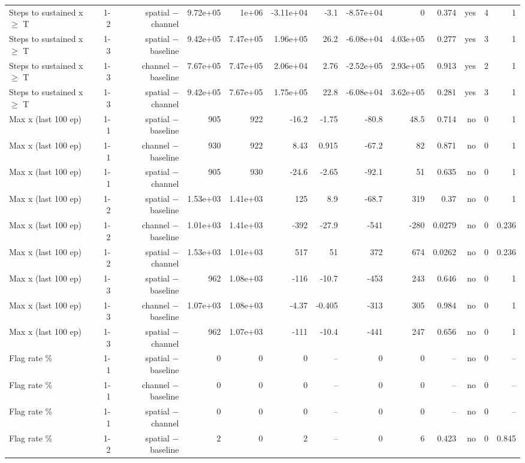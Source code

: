 \begin{table}[t]
\begin{tabular}{lrrrrrrrrrrrr}
Steps to sustained x $\geq$ T & 1-2 & spatial $-$ channel & 9.72e+05 & 1e+06 & -3.11e+04 & -3.1 & -8.57e+04 & 0 & 0.374 & yes & 4 & 1 \\
Steps to sustained x $\geq$ T & 1-3 & spatial $-$ baseline & 9.42e+05 & 7.47e+05 & 1.96e+05 & 26.2 & -6.08e+04 & 4.03e+05 & 0.277 & yes & 3 & 1 \\
Steps to sustained x $\geq$ T & 1-3 & channel $-$ baseline & 7.67e+05 & 7.47e+05 & 2.06e+04 & 2.76 & -2.52e+05 & 2.93e+05 & 0.913 & yes & 2 & 1 \\
Steps to sustained x $\geq$ T & 1-3 & spatial $-$ channel & 9.42e+05 & 7.67e+05 & 1.75e+05 & 22.8 & -6.08e+04 & 3.62e+05 & 0.281 & yes & 3 & 1 \\
Max x (last 100 ep) & 1-1 & spatial $-$ baseline & 905 & 922 & -16.2 & -1.75 & -80.8 & 48.5 & 0.714 & no & 0 & 1 \\
Max x (last 100 ep) & 1-1 & channel $-$ baseline & 930 & 922 & 8.43 & 0.915 & -67.2 & 82 & 0.871 & no & 0 & 1 \\
Max x (last 100 ep) & 1-1 & spatial $-$ channel & 905 & 930 & -24.6 & -2.65 & -92.1 & 51 & 0.635 & no & 0 & 1 \\
Max x (last 100 ep) & 1-2 & spatial $-$ baseline & 1.53e+03 & 1.41e+03 & 125 & 8.9 & -68.7 & 319 & 0.37 & no & 0 & 1 \\
Max x (last 100 ep) & 1-2 & channel $-$ baseline & 1.01e+03 & 1.41e+03 & -392 & -27.9 & -541 & -280 & 0.0279 & no & 0 & 0.236 \\
Max x (last 100 ep) & 1-2 & spatial $-$ channel & 1.53e+03 & 1.01e+03 & 517 & 51 & 372 & 674 & 0.0262 & no & 0 & 0.236 \\
Max x (last 100 ep) & 1-3 & spatial $-$ baseline & 962 & 1.08e+03 & -116 & -10.7 & -453 & 243 & 0.646 & no & 0 & 1 \\
Max x (last 100 ep) & 1-3 & channel $-$ baseline & 1.07e+03 & 1.08e+03 & -4.37 & -0.405 & -313 & 305 & 0.984 & no & 0 & 1 \\
Max x (last 100 ep) & 1-3 & spatial $-$ channel & 962 & 1.07e+03 & -111 & -10.4 & -441 & 247 & 0.656 & no & 0 & 1 \\
Flag rate \% & 1-1 & spatial $-$ baseline & 0 & 0 & 0 & – & 0 & 0 & – & no & 0 & – \\
Flag rate \% & 1-1 & channel $-$ baseline & 0 & 0 & 0 & – & 0 & 0 & – & no & 0 & – \\
Flag rate \% & 1-1 & spatial $-$ channel & 0 & 0 & 0 & – & 0 & 0 & – & no & 0 & – \\
Flag rate \% & 1-2 & spatial $-$ baseline & 2 & 0 & 2 & – & 0 & 6 & 0.423 & no & 0 & 0.845 \\

\end{tabular}
\end{table}

